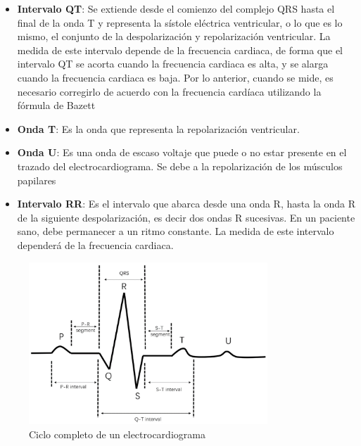 \begin{itemize}
        \item \textbf{Intervalo QT}: Se extiende desde el comienzo del complejo QRS hasta el final de la onda T y representa la sístole eléctrica ventricular, o lo que es lo mismo, el conjunto de la despolarización y repolarización ventricular. La medida de este intervalo depende de la frecuencia cardiaca, de forma que el intervalo QT se acorta cuando la frecuencia cardiaca es alta, y se alarga cuando la frecuencia cardiaca es baja. Por lo anterior, cuando se mide, es necesario corregirlo de acuerdo con la frecuencia cardíaca utilizando la fórmula de Bazett
        \item \textbf{Onda T}: Es la onda que representa la repolarización ventricular.
        \item \textbf{Onda U}: Es una onda de escaso voltaje que puede o no estar presente en el trazado del electrocardiograma. Se debe a la repolarización de los músculos papilares
        \item \textbf{Intervalo RR}: Es el intervalo que abarca desde una onda R, hasta la onda R de la siguiente despolarización, es decir dos ondas R sucesivas. En un paciente sano, debe permanecer a un ritmo constante. La medida de este intervalo dependerá de la frecuencia cardiaca.
    \end{itemize}

    \begin{figure}[H]
        \centering
        \includegraphics[width=0.8\textwidth]{img/ECG_ondas.png}
        \caption[Ciclo completo de un electrocardiograma]{Ciclo completo de un electrocardiograma\footnotemark}
        \label{fig:ECG_ondas}
    \end{figure}

